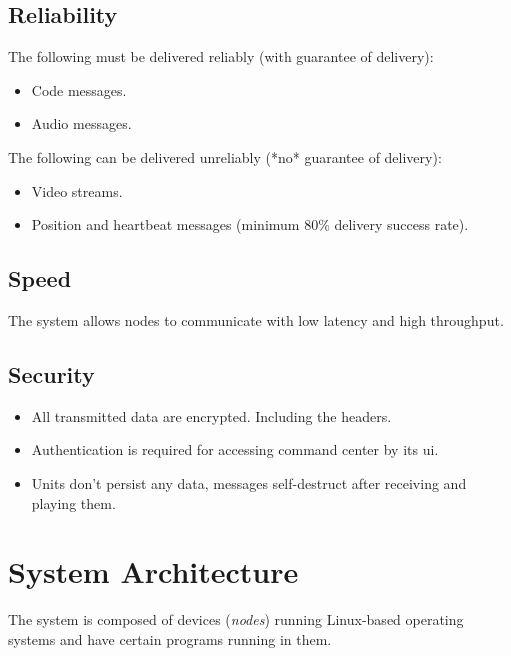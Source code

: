 \subsection{Reliability}
The following must be delivered reliably (with guarantee of delivery):
\begin{itemize}[itemsep=1pt, topsep=5pt]
    \item Code messages.
    \item Audio messages.
\end{itemize}

The following can be delivered unreliably (*no* guarantee of delivery):
\begin{itemize}
    \item Video streams.
    \item Position and heartbeat messages (minimum 80\% delivery success rate).
\end{itemize}

\subsection{Speed}
The system allows nodes to communicate with low latency and high throughput.

\subsection{Security}
\begin{itemize}[itemsep=1pt, topsep=5pt]
    \item All transmitted data are encrypted. Including the headers.
    \item Authentication is required for accessing command center by its \acrshort{ui}.
    \item Units don't persist any data, messages self-destruct after receiving and playing them.
\end{itemize}

\section{System Architecture}
The system is composed of devices (\textit{nodes}) running Linux-based operating systems and have certain programs running in them.

